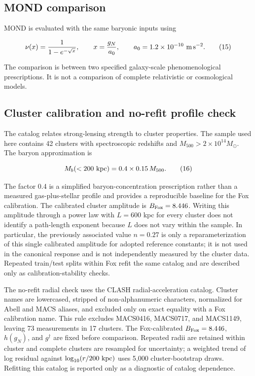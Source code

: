 \documentclass[utf8]{FrontiersinHarvard}
\begin{document}
\subsection{MOND comparison}\label{mond-comparison}

MOND is evaluated with the same baryonic inputs using

\[
\nu(x)=\frac{1}{1-e^{-\sqrt{x}}},
\qquad x=\frac{g_N}{a_0},
\qquad a_0=1.2\times10^{-10}\ {\rm m\,s^{-2}} .
\tag{15}
\]

The comparison is between two specified galaxy-scale phenomenological prescriptions. It is not a comparison of complete relativistic or cosmological models.

\subsection{Cluster calibration and no-refit profile check}\label{cluster-calibration-and-no-refit-profile-check}

The \citet{fox2022} catalog relates strong-lensing strength to cluster properties. The sample used here contains 42 clusters with spectroscopic redshifts and \(M_{500}>2\times10^{14}M_\odot\). The baryon approximation is

\[
M_b(<200\ {\rm kpc})=0.4\times0.15\,M_{500}.
\tag{16}
\]

The factor 0.4 is a simplified baryon-concentration prescription rather than a measured gas-plus-stellar profile and provides a reproducible baseline for the Fox calibration. The calibrated cluster amplitude is \(B_{\rm Fox}=8.446\). Writing this amplitude through a power law with \(L=600\) kpc for every cluster does not identify a path-length exponent because \(L\) does not vary within the sample. In particular, the previously associated value \(n=0.27\) is only a reparameterization of this single calibrated amplitude for adopted reference constants; it is not used in the canonical response and is not independently measured by the cluster data. Repeated train/test splits within Fox refit the same catalog and are described only as calibration-stability checks.

The no-refit radial check uses the \citet{tian2020} CLASH radial-acceleration catalog. Cluster names are lowercased, stripped of non-alphanumeric characters, normalized for Abell and MACS aliases, and excluded only on exact equality with a Fox calibration name. This rule excludes MACS0416, MACS0717, and MACS1149, leaving 73 measurements in 17 clusters. The Fox-calibrated \(B_{\rm Fox}=8.446\), \(h(g_N)\), and \(g^\dagger\) are fixed before comparison. Repeated radii are retained within cluster and complete clusters are resampled for uncertainty; a weighted trend of log residual against \(\log_{10}(r/200\ {\rm kpc})\) uses 5,000 cluster-bootstrap draws. Refitting this catalog is reported only as a diagnostic of catalog dependence.
\end{document}
